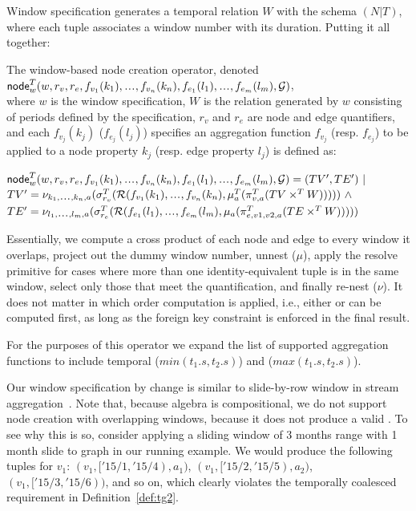 Window specification generates a temporal relation $W$ with the schema
$(N|T)$, where each tuple associates a window number with its
duration.  Putting it all together:

\begin{definition}
\label{def:nodecrw}
The window-based node creation operator, denoted
$\insql{node}^T_w(w,r_v,r_e,f_{v_1}(k_1)\varlist f_{v_n}(k_n),f_{e_1}(l_1)\varlist f_{e_m}(l_m),\ttt)$,\\
where $w$ is the window specification, $W$ is the relation generated
by $w$ consisting of periods defined by the specification, $r_v$ and
$r_e$ are node and edge quantifiers, and each $f_{v_j}(k_j)$
($f_{e_j}(l_j)$) specifies an aggregation function $f_{v_j}$
(resp. $f_{e_j}$) to be applied to a node property $k_j$ (resp. edge
property $l_j$) is defined as:

$\insql{node}^T_w(w,r_v,r_e,f_{v_1}(k_1)\varlist f_{v_n}(k_n),f_{e_1}(l_1)\varlist f_{e_m}(l_m),\ttt) = (TV', TE') ~|~ $\\$TV' = \nu_{k_1\varlist k_n,a}(\sigma^T_{r_v}(\resolve{f_{v_1}(k_1)\varlist f_{v_n}(k_n)}{\break\mu^T_a(\pi^T_{v,a}(TV \times^T W))})) ~\land$\\
$TE' = \nu_{l_1\varlist l_m,a}(\sigma^T_{r_e}(\resolve{f_{e_1}(l_1)\varlist f_{e_m}(l_m)}{\mu_a(\break\pi^T_{e,v1,v2,a}(TE \times^T W))}))$
\end{definition}

Essentially, we compute a cross product of each node and edge to every
window it overlaps, project out the dummy window number, unnest
($\mu$), apply the resolve primitive for cases
where more than one identity-equivalent tuple is in the same window,
select only those that meet the quantification, and finally re-nest
($\nu$).  It does not matter in which order
computation is applied, i.e., either \tv or \te can be computed first,
as long as the foreign key constraint is enforced in the final result.

For the purposes of this operator we expand the list of supported
aggregation functions to include temporal 
($min(t_1.s,t_2.s)$) and  ($max(t_1.s,t_2.s)$).

Our window specification by change is similar to slide-by-row window
in stream aggregation~\cite{Li2005}.  Note that, because \tg algebra
is compositional, we do not support node creation with overlapping
windows, because it does not produce a valid \tg.  To see why this is
so, consider applying a sliding window of 3 months range with 1 month
slide to graph  in our running example.  We would
produce the following tuples for $v_1$: $(v_1, ['15/1, '15/4), a_1)$,
  $(v_1, ['15/2, '15/5), a_2)$, $(v_1, ['15/3, '15/6))$, and so on, which
      clearly violates the temporally coalesced requirement in
      Definition~\ref{def:tg2}.

